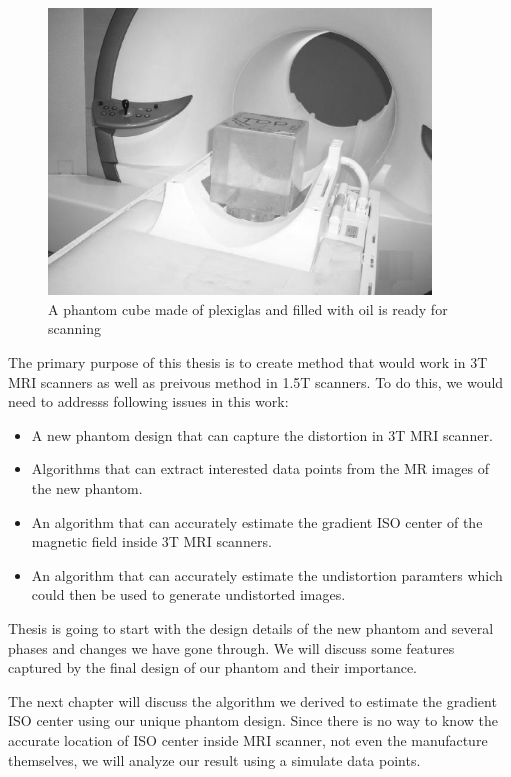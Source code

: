 \begin{figure}[htb]
  \begin{minipage}{0.80\linewidth}
    \centering
    \centerline{\mbox{\includegraphics[width=4in]{introduction/images/phantom_scanner2.eps}}}
    \centerline{}\medskip
  \end{minipage}
  \caption{A phantom cube made of plexiglas and filled with oil is ready for scanning} \label{fig:1}
\end{figure} 

The primary purpose of this thesis is to create method that would work in 3T MRI scanners as well as preivous
method in 1.5T scanners. To do this, we would need to addresss following issues in this work:
\begin{itemize}
\item A new phantom design that can capture the distortion in 3T MRI scanner. 
\item Algorithms that can extract interested data points from the MR images of the new phantom.
\item An algorithm that can accurately estimate the gradient ISO center of the magnetic field inside 3T MRI 
  scanners.
\item An algorithm that can accurately estimate the undistortion paramters which could then be used to generate
  undistorted images.
\end{itemize}

Thesis is going to start with the design details of the new phantom and several phases and changes we have
gone through. We will discuss some features captured by the final design of our phantom and their importance.

The next chapter will discuss the algorithm we derived to estimate the gradient ISO center using our unique
phantom design. Since there is no way to know the accurate location of ISO center inside MRI scanner, not even
the manufacture themselves, we will analyze our result using a simulate data points. 


